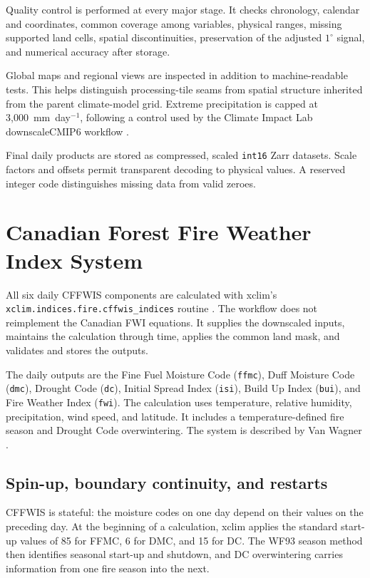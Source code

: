 \documentclass[11pt]{article}
\begin{document}
Quality control is performed at every major stage. It checks chronology,
calendar and coordinates, common coverage among variables, physical ranges,
missing supported land cells, spatial discontinuities, preservation of the
adjusted $1^{\circ}$ signal, and numerical accuracy after storage.

Global maps and regional views are inspected in addition to machine-readable
tests. This helps distinguish processing-tile seams from spatial structure
inherited from the parent climate-model grid. Extreme precipitation is capped
at 3,000~mm~day$^{-1}$, following a control used by the Climate Impact Lab
downscaleCMIP6 workflow \cite{cil2024}.

Final daily products are stored as compressed, scaled \texttt{int16} Zarr
datasets. Scale factors and offsets permit transparent decoding to physical
values. A reserved integer code distinguishes missing data from valid zeroes.

\section{Canadian Forest Fire Weather Index System}

All six daily CFFWIS components are calculated with xclim's
\nolinkurl{xclim.indices.fire.cffwis_indices} routine \cite{xclim2023}. The workflow does not
reimplement the Canadian FWI equations. It supplies the downscaled inputs,
maintains the calculation through time, applies the common land mask, and
validates and stores the outputs.

The daily outputs are the Fine Fuel Moisture Code (\texttt{ffmc}), Duff
Moisture Code (\texttt{dmc}), Drought Code (\texttt{dc}), Initial Spread Index
(\texttt{isi}), Build Up Index (\texttt{bui}), and Fire Weather Index
(\texttt{fwi}). The calculation uses temperature, relative humidity,
precipitation, wind speed, and latitude. It includes a temperature-defined fire
season and Drought Code overwintering. The system is described by Van Wagner
\cite{vanwagner1987}.

\subsection{Spin-up, boundary continuity, and restarts}

CFFWIS is stateful: the moisture codes on one day depend on their values on the
preceding day. At the beginning of a calculation, xclim applies the standard
start-up values of 85 for FFMC, 6 for DMC, and 15 for DC. The WF93 season method
then identifies seasonal start-up and shutdown, and DC overwintering carries
information from one fire season into the next.
\end{document}

